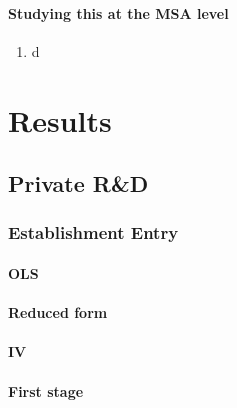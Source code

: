 \documentclass[7pt,english]{article}
\theoremstyle{remark}
\begin{document}
\paragraph{Studying this at the MSA level}
\begin{enumerate}
	\item d
\end{enumerate}

\newpage
\section{Results}

\subsection{Private R\&D}


\subsubsection{Establishment Entry}

\paragraph{OLS}
\begin{table}[h]
	
\end{table}

\newpage
\paragraph{Reduced form}
\begin{table}[h]
	
\end{table}

\paragraph{IV}
\begin{table}[h]
	
\end{table}

\paragraph{First stage}
\begin{table}[h]
	
\end{table}
\end{document}
